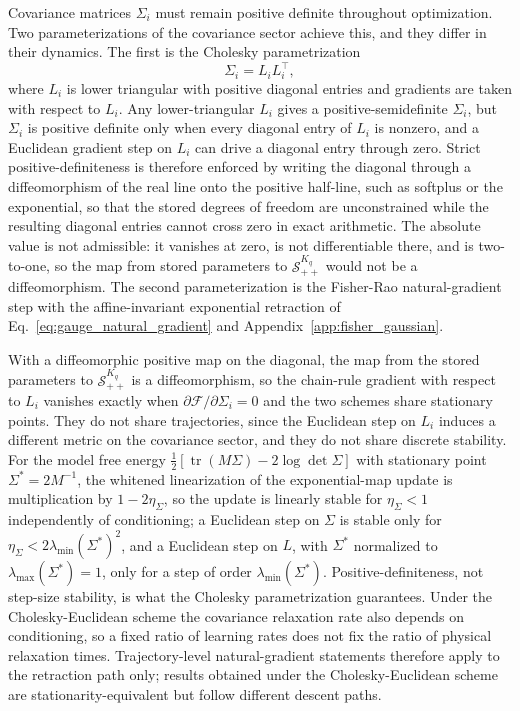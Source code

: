 \documentclass[11pt]{article}
\begin{document}
Covariance matrices $\Sigma_i$ must remain positive definite throughout optimization. Two parameterizations of the covariance sector achieve this, and they differ in their dynamics. The first is the Cholesky parametrization
\begin{equation}
\Sigma_i = L_i L_i^\top,
\end{equation}
where $L_i$ is lower triangular with positive diagonal entries and gradients are taken with respect to $L_i$. Any lower-triangular $L_i$ gives a positive-semidefinite $\Sigma_i$, but $\Sigma_i$ is positive definite only when every diagonal entry of $L_i$ is nonzero, and a Euclidean gradient step on $L_i$ can drive a diagonal entry through zero. Strict positive-definiteness is therefore enforced by writing the diagonal through a diffeomorphism of the real line onto the positive half-line, such as softplus or the exponential, so that the stored degrees of freedom are unconstrained while the resulting diagonal entries cannot cross zero in exact arithmetic. The absolute value is not admissible: it vanishes at zero, is not differentiable there, and is two-to-one, so the map from stored parameters to $\mathcal{S}_{++}^{K_q}$ would not be a diffeomorphism. The second parameterization is the Fisher-Rao natural-gradient step with the affine-invariant exponential retraction of Eq.~\eqref{eq:gauge_natural_gradient} and Appendix~\ref{app:fisher_gaussian}.

With a diffeomorphic positive map on the diagonal, the map from the stored parameters to $\mathcal{S}_{++}^{K_q}$ is a diffeomorphism, so the chain-rule gradient with respect to $L_i$ vanishes exactly when $\partial\mathcal{F}/\partial\Sigma_i = 0$ and the two schemes share stationary points. They do not share trajectories, since the Euclidean step on $L_i$ induces a different metric on the covariance sector, and they do not share discrete stability. For the model free energy $\tfrac{1}{2}[\operatorname{tr}(M\Sigma) - 2\log\det\Sigma]$ with stationary point $\Sigma^* = 2M^{-1}$, the whitened linearization of the exponential-map update is multiplication by $1 - 2\eta_\Sigma$, so the update is linearly stable for $\eta_\Sigma < 1$ independently of conditioning; a Euclidean step on $\Sigma$ is stable only for $\eta_\Sigma < 2\lambda_{\min}(\Sigma^*)^2$, and a Euclidean step on $L$, with $\Sigma^*$ normalized to $\lambda_{\max}(\Sigma^*) = 1$, only for a step of order $\lambda_{\min}(\Sigma^*)$. Positive-definiteness, not step-size stability, is what the Cholesky parametrization guarantees. Under the Cholesky-Euclidean scheme the covariance relaxation rate also depends on conditioning, so a fixed ratio of learning rates does not fix the ratio of physical relaxation times. Trajectory-level natural-gradient statements therefore apply to the retraction path only; results obtained under the Cholesky-Euclidean scheme are stationarity-equivalent but follow different descent paths.
\end{document}
